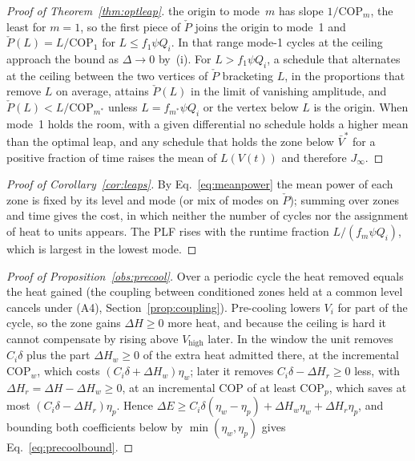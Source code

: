 \documentclass[10pt,a4paper,twocolumn]{article}
\theoremstyle{definition}
\begin{document}
\begin{proof}[Proof of Theorem~\ref{thm:optleap}]
the origin to mode~$m$ has slope $1/\mathrm{COP}_m$, the least for $m=1$, so the first piece of $\check P$ joins the origin to mode~1 and $\check P(L)=L/\mathrm{COP}_1$ for $L\le f_1\psi Q_i$. In that range mode-1 cycles at the ceiling approach the bound as $\Delta\to0$ by~(i). For $L>f_1\psi Q_i$, a schedule that alternates at the ceiling between the two vertices of $\check P$ bracketing $L$, in the proportions that remove $L$ on average, attains $\check P(L)$ in the limit of vanishing amplitude, and $\check P(L)<L/\mathrm{COP}_{m^\ast}$ unless $L=f_{m^\ast}\psi Q_i$ or the vertex below $L$ is the origin. When mode~1 holds the room, with a given differential no schedule holds a higher mean than the optimal leap, and any schedule that holds the zone below $\bar V^\ast$ for a positive fraction of time raises the mean of $L(V(t))$ and therefore $J_\infty$.
\end{proof}

\begin{proof}[Proof of Corollary~\ref{cor:leaps}]
By Eq.~\eqref{eq:meanpower} the mean power of each zone is fixed by its level and mode (or mix of modes on $\check P$); summing over zones and time gives the cost, in which neither the number of cycles nor the assignment of heat to units appears. The PLF rises with the runtime fraction $L/(f_m\psi Q_i)$, which is largest in the lowest mode.
\end{proof}

\begin{proof}[Proof of Proposition~\ref{obs:precool}]
Over a periodic cycle the heat removed equals the heat gained (the coupling between conditioned zones held at a common level cancels under (A4), Section~\ref{prop:coupling}). Pre-cooling lowers $V_i$ for part of the cycle, so the zone gains $\Delta H\ge0$ more heat, and because the ceiling is hard it cannot compensate by rising above $V_{\text{high}}$ later. In the window the unit removes $C_i\delta$ plus the part $\Delta H_w\ge0$ of the extra heat admitted there, at the incremental $\mathrm{COP}_w$, which costs $(C_i\delta+\Delta H_w)\eta_w$; later it removes $C_i\delta-\Delta H_r\ge0$ less, with $\Delta H_r=\Delta H-\Delta H_w\ge0$, at an incremental COP of at least $\mathrm{COP}_p$, which saves at most $(C_i\delta-\Delta H_r)\eta_p$. Hence $\Delta E\ge C_i\delta(\eta_w-\eta_p)+\Delta H_w\eta_w+\Delta H_r\eta_p$, and bounding both coefficients below by $\min(\eta_w,\eta_p)$ gives Eq.~\eqref{eq:precoolbound}.
\end{proof}
\end{document}

